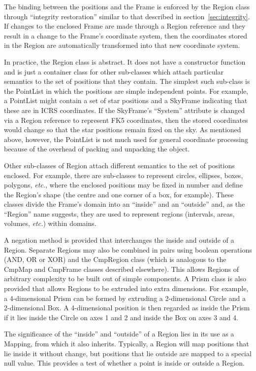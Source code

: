 \documentclass[final,authoryear,5p,times,twocolumn]{elsarticle}
\begin{document}
The binding between the positions and the Frame is enforced by the Region
class through ``integrity restoration'' similar to that described in
section~\ref{sec:integrity}. If changes to the enclosed Frame are made
through a Region reference and they result in a change to the Frame's
coordinate system, then the coordinates stored in the Region are
automatically transformed into that new coordinate system.

In practice, the Region class is abstract. It does not have a constructor
function and is just a container class for other sub-classes which attach
particular semantics to the set of positions that they contain. The
simplest such sub-class is the PointList in which the positions are
simple independent points. For example, a PointList might contain a set
of star positions and a SkyFrame indicating that these are in ICRS
coordinates. If the SkyFrame's ``System'' attribute is changed via a Region
reference to represent FK5 coordinates, then the stored coordinates would
change so that the star positions remain fixed on the sky. As mentioned
above, however, the PointList is not much used for general coordinate
processing because of the overhead of packing and unpacking the object.

Other sub-classes of Region attach different semantics to the set of
positions enclosed. For example, there are sub-classes to represent
circles, ellipses, boxes, polygons, \emph{etc.}, where the enclosed positions
may be fixed in number and define the Region's shape (the centre and one
corner of a box, for example). These classes divide the Frame's domain
into an ``inside'' and an ``outside'' and, as the ``Region'' name suggests,
they are used to represent regions (intervals, areas, volumes, \emph{etc.})
within domains.

A negation method is provided that interchanges the inside and outside of
a Region. Separate Regions may also be combined in pairs using boolean
operations (AND, OR or XOR) and the CmpRegion class (which is analogous
to the CmpMap and CmpFrame classes described elsewhere). This allows
Regions of arbitrary complexity to be built out of simple components. A
Prism class is also provided that allows Regions to be extruded into
extra dimensions. For example, a 4-dimensional Prism can be formed by
extruding a 2-dimensional Circle and a 2-dimensional Box. A 4-dimensional
position is then regarded as inside the Prism if it lies inside the
Circle on axes 1 and 2 and inside the Box on axes 3 and 4.

The significance of the ``inside'' and ``outside'' of a Region lies in
its use as a Mapping, from which it also inherits. Typically, a Region
will map positions that lie inside it without change, but positions that
lie outside are mapped to a special null value. This provides a test of
whether a point is inside or outside a Region.
\end{document}
